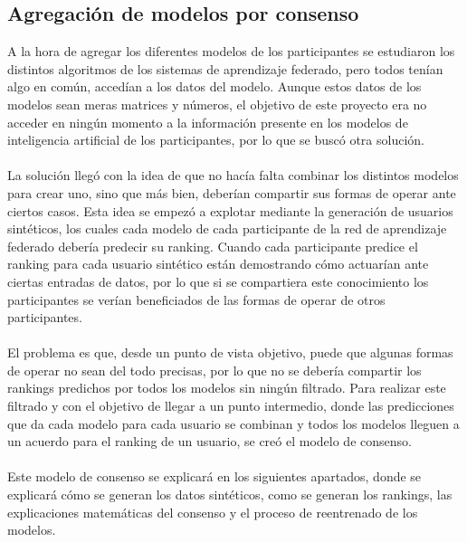 \subsection{Agregación de modelos por consenso}\label{Consenso}
A la hora de agregar los diferentes modelos de los participantes se estudiaron los distintos algoritmos de los sistemas de aprendizaje federado, pero todos tenían algo en común, accedían a los datos del modelo. Aunque estos datos de los modelos sean meras matrices y números, el objetivo de este proyecto era no acceder en ningún momento a la información presente en los modelos de inteligencia artificial de los participantes, por lo que se buscó otra solución.
\\ \\
La solución llegó con la idea de que no hacía falta combinar los distintos modelos para crear uno, sino que más bien, deberían compartir sus formas de operar ante ciertos casos. Esta idea se empezó a explotar mediante la generación de usuarios sintéticos, los cuales cada modelo de cada participante de la red de aprendizaje federado debería predecir su ranking. Cuando cada participante predice el ranking para cada usuario sintético están demostrando cómo actuarían ante ciertas entradas de datos, por lo que si se compartiera este conocimiento los participantes se verían beneficiados de las formas de operar de otros participantes.
\\ \\
El problema es que, desde un punto de vista objetivo, puede que algunas formas de operar no sean del todo precisas, por lo que no se debería compartir los rankings predichos por todos los modelos sin ningún filtrado. Para realizar este filtrado y con el objetivo de llegar a un punto intermedio, donde las predicciones que da cada modelo para cada usuario se combinan y todos los modelos lleguen a un acuerdo para el ranking de un usuario, se creó el modelo de consenso. 
\\ \\
Este modelo de consenso se explicará en los siguientes apartados, donde se explicará cómo se generan los datos sintéticos, como se generan los rankings, las explicaciones matemáticas del consenso y el proceso de reentrenado de los modelos.

